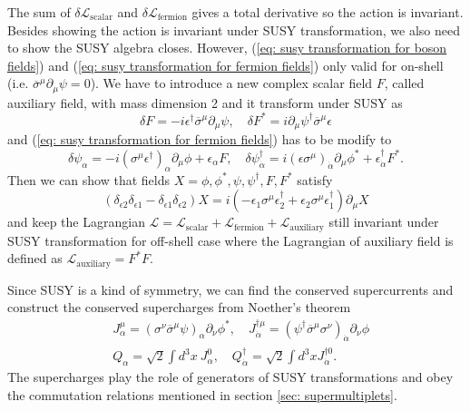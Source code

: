\documentclass[12pt]{report}
\begin{document}
The sum of $\delta \mathcal{L}_{\mathrm{scalar}}$ and $\delta \mathcal{L}_{\mathrm{fermion}}$ gives a total derivative so the action is invariant.
Besides showing the action is invariant under SUSY transformation, we also need to show the SUSY algebra closes.
However, (\ref{eq: susy transformation for boson fields}) and (\ref{eq: susy transformation for fermion fields}) only valid for on-shell (i.e. $\overline{\sigma}^{\mu} \partial_{\mu} \psi = 0$).
We have to introduce a new complex scalar field $F$, called auxiliary field, with mass dimension 2 and it transform under SUSY as
\begin{equation}
\delta F = - i \epsilon^{\dag} \overline{\sigma}^{\mu} \partial_{\mu} \psi, \quad 
\delta F^{*} = i \partial_{\mu} \psi^{\dag} \overline{\sigma}^{\mu} \epsilon
\end{equation}
and (\ref{eq: susy transformation for fermion fields}) has to be modify to
\begin{equation}
\delta \psi_{\alpha} = -i (\sigma^{\mu} \epsilon^{\dag})_{\alpha} \partial_{\mu} \phi + \epsilon_{\alpha} F, \quad 
\delta \psi^{\dag}_{\dot{\alpha}} = i (\epsilon \sigma^{\mu})_{\dot{\alpha}} \partial_{\mu} \phi^{*} + \epsilon^{\dag}_{\dot{\alpha}} F^{*}.
\end{equation}
Then we can show that fields $X = \phi, \phi^{*}, \psi, \psi^{\dag}, F, F^{*}$ satisfy
\begin{equation}
(\delta_{\epsilon2} \delta_{\epsilon1} - \delta_{\epsilon1} \delta_{\epsilon2}) X = i (- \epsilon_{1} \sigma^{\mu} \epsilon^{\dag}_{2} + \epsilon_{2} \sigma^{\mu} \epsilon^{\dag}_{1}) \partial_{\mu} X
\end{equation}
and keep the Lagrangian $\mathcal{L} = \mathcal{L}_{\mathrm{scalar}} + \mathcal{L}_{\mathrm{fermion}} + \mathcal{L}_{\mathrm{auxiliary}}$ still invariant under SUSY transformation for off-shell case where the Lagrangian of auxiliary field is defined as $\mathcal{L}_{\mathrm{auxiliary}} = F^{*} F$.

Since SUSY is a kind of symmetry, we can find the conserved supercurrents and construct the conserved supercharges from Noether's theorem
\begin{align}
& J^{\mu}_{\alpha} = (\sigma^{\nu} \overline{\sigma}^{\mu} \psi)_{\alpha} \partial_{\nu} \phi^{*}, \quad 
J^{\dag \mu}_{\dot{\alpha}} = ( \psi^{\dag} \overline{\sigma}^{\mu} \sigma^{\nu})_{\dot{\alpha}} \partial_{\nu} \phi\\
%
& Q_{\alpha} = \sqrt{2} \int d^{3}x \ J^{0}_{\alpha}, \quad 
Q^{\dag}_{\dot{\alpha}} = \sqrt{2} \int d^{3}x J^{\dag 0}_{\dot{\alpha}} .
\end{align}
The supercharges play the role of generators of SUSY transformations and obey the commutation relations mentioned in section \ref{sec: supermultiplets}.
\end{document}
